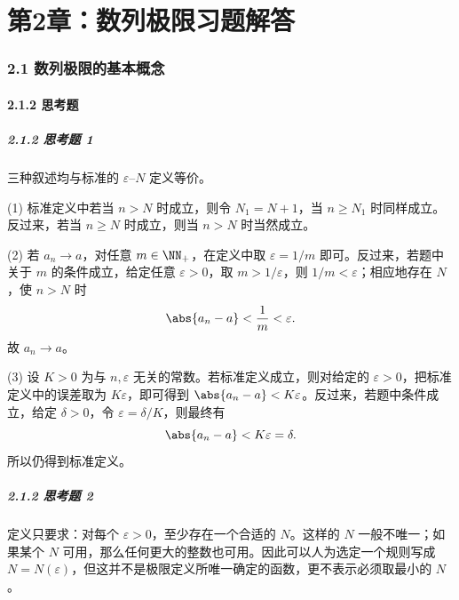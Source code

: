 
\chapter*{第2章：数列极限习题解答}
\subsection*{2.1 数列极限的基本概念}

\subsubsection*{2.1.2 思考题}

\paragraph{2.1.2 思考题 1}
\begin{xsolution}
三种叙述均与标准的 $\varepsilon$--$N$ 定义等价。

(1) 标准定义中若当 $n>N$ 时成立，则令 $N_1=N+1$，当 $n\ge N_1$ 时同样成立。反过来，若当 $n\ge N$ 时成立，则当 $n>N$ 时当然成立。

(2) 若 $a_n\to a$，对任意 $m\in\NN_+$，在定义中取 $\varepsilon=1/m$ 即可。反过来，若题中关于 $m$ 的条件成立，给定任意 $\varepsilon>0$，取 $m>1/\varepsilon$，则 $1/m<\varepsilon$；相应地存在 $N$，使 $n>N$ 时
\[
  \abs{a_n-a}<\frac1m<\varepsilon.
\]
故 $a_n\to a$。

(3) 设 $K>0$ 为与 $n,\varepsilon$ 无关的常数。若标准定义成立，则对给定的 $\varepsilon>0$，把标准定义中的误差取为 $K\varepsilon$，即可得到 $\abs{a_n-a}<K\varepsilon$。反过来，若题中条件成立，给定 $\delta>0$，令 $\varepsilon=\delta/K$，则最终有
\[
  \abs{a_n-a}<K\varepsilon=\delta.
\]
所以仍得到标准定义。
\end{xsolution}

\paragraph{2.1.2 思考题 2}
\begin{xsolution}
定义只要求：对每个 $\varepsilon>0$，至少存在一个合适的 $N$。这样的 $N$ 一般不唯一；如果某个 $N$ 可用，那么任何更大的整数也可用。因此可以人为选定一个规则写成 $N=N(\varepsilon)$，但这并不是极限定义所唯一确定的函数，更不表示必须取最小的 $N$。
\end{xsolution}

